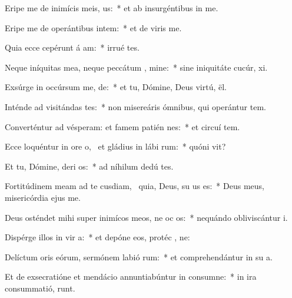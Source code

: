 \item Eripe me de inimícis meis,  us:~* et ab insurgéntibus in   me.
\item Eripe me de operántibus intem:~* et de viris   me.
\item Quia ecce cepérunt á am:~* irrué   tes.
\item Neque iníquitas mea, neque peccátum , mine:~* sine iniquitáte cucúr,  xi.
\item Exsúrge in occúrsum me,  de:~* et tu, Dómine, Deus virtú,  ël.
\item Inténde ad visitándas  tes:~* non misereáris ómnibus, qui operántur tem.
\item Converténtur ad vésperam: et famem patién  nes:~* et circuí tem.
\item Ecce loquéntur in ore o,~\pscross{} et gládius in lábi rum:~* quóni  vit?
\item Et tu, Dómine, deri os:~* ad níhilum dedú  tes.
\item Fortitúdinem meam ad te cusdiam,~\pscross{} quia, Deus, su us es:~* Deus meus, misericórdia ejus  me.
\item Deus osténdet mihi super inimícos meos, ne oc os:~* nequándo obliviscántur  i.
\item Dispérge illos in vir a:~* et depóne eos, protéc , ne:
\item Delíctum oris eórum, sermónem labió rum:~* et comprehendántur in su a.
\item Et de exsecratióne et mendácio annuntiabúntur in consumne:~* in ira consummatió,   runt.
